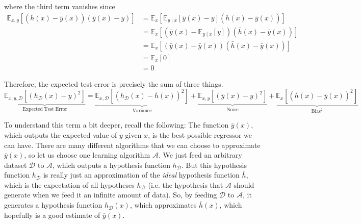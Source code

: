 \documentclass{article}
\begin{document}
  where the third term vanishes since
  \begin{align*}
    \mathbb{E}_{x, y} \left[\left(\bar{h}(x) - \bar{y}(x)\right)\left(\bar{y}(x) - y\right)\right] 
    &= \mathbb{E}_{x}\left[\mathbb{E}_{y \mid x} \left[\bar{y}(x) - y \right] \left(\bar{h}(x) - \bar{y}(x) \right) \right] \\
    &= \mathbb{E}_{x} \left[ \left( \bar{y}(x) - \mathbb{E}_{y \mid x} \left [ y \right]\right) \left(\bar{h}(x) - \bar{y}(x)\right)\right] \\
    &= \mathbb{E}_{x} \left[ \left( \bar{y}(x) - \bar{y}(x) \right) \left(\bar{h}(x) - \bar{y}(x)\right)\right] \\
    &= \mathbb{E}_{x} \left[ 0 \right] \\
    &= 0
  \end{align*}

  Therefore, the expected test error is precisely the sum of three things.
  \begin{equation*}
    \underbrace{\mathbb{E}_{x, y, \mathcal{D}} \left[\left(h_{\mathcal{D}}(x) - y\right)^{2}\right]}_\mathrm{Expected\;Test\;Error} = \underbrace{\mathbb{E}_{x, \mathcal{D}}\left[\left(h_{\mathcal{D}}(x) - \bar{h}(x)\right)^{2}\right]}_\mathrm{Variance} + \underbrace{\mathbb{E}_{x, y}\left[\left(\bar{y}(x) - y\right)^{2}\right]}_\mathrm{Noise} + \underbrace{\mathbb{E}_{x}\left[\left(\bar{h}(x) - \bar{y}(x)\right)^{2}\right]}_\mathrm{Bias^2}
  \end{equation*}

  To understand this term a bit deeper, recall the following: The function $\overline{y}(x)$, which outputs the expected value of $y$ given $x$, is the best possible regressor we can have. There are many different algorithms that we can choose to approximate $\overline{y}(x)$, so let us choose one learning algorithm $\mathcal{A}$. We just feed an arbitrary dataset $\mathcal{D}$ to $\mathcal{A}$, which outputs a hypothesis function $h_\mathcal{D}$. But this hypothesis function $h_\mathcal{D}$ is really just an approximation of the \textit{ideal} hypothesis function $\overline{h}$, which is the expectation of all hypotheses $h_\mathcal{D}$ (i.e. the hypothesis that $\mathcal{A}$ should generate when we feed it an infinite amount of data). So, by feeding $\mathcal{D}$ to $\mathcal{A}$, it generates a hypothesis function $h_\mathcal{D}(x)$, which approximates $\overline{h}(x)$, which hopefully is a good estimate of $\overline{y}(x)$.
\end{document}

